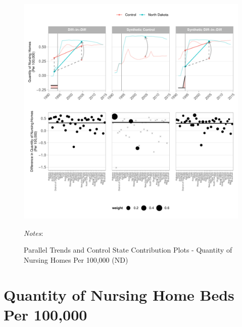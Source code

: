 \documentclass[12pt]{article}
\begin{document}
\newpage
\begin{figure}[t]
	\begin{center}
	\caption{\centering Parallel Trends and Control State Contribution Plots - Quantity of Nursing Homes Per 100,000 (ND)}
    \includegraphics[width=\textwidth,keepaspectratio]{q_nursing_homes_plots_ND.pdf}
    \end{center}
    \footnotesize
		\textit{Notes}:
\end{figure}
\clearpage

\newpage



\clearpage






\newpage
\vspace*{8cm}
\section{Quantity of Nursing Home Beds Per 100,000}
\clearpage
\end{document}

